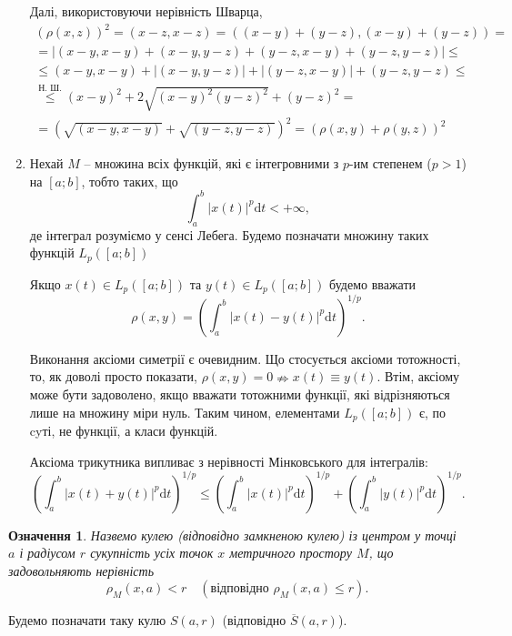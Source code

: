 \documentclass[14pt,twoside]{extreport}
\theoremstyle{mystyle}
\newtheorem{dfn}{Означення}
\numberwithin{equation}{chapter}
\begin{document}
\begin{enumerate}
 Далі, використовуючи нерівність Шварца,
 \begin{multline*}
   (\rho(x, z))^2 = (x - z , x - z) = ((x-y) + (y-z), (x-y) + (y-z)) =\\
   = |(x-y, x-y) + (x-y, y-z) + (y-z, x-y) +(y-z, y-z)| \leqslant\\
   \leqslant (x-y, x-y) + |(x-y, y-z)| + |(y-z, x-y)| +(y-z, y-z) \leqslant\\
   \mathop{\leqslant}\limits^{\textrm{Н. Ш.}} (x-y)^2 + 2\sqrt{(x-y)^2(y-z)^2} + (y-z)^2=\\
   = \left(\sqrt{(x-y, x-y)} + \sqrt{(y-z, y-z)}\right)^2 = (\rho(x,y) + \rho(y,z))^2
 \end{multline*}
 \item Нехай $M$ -- множина всіх функцій, які є інтегровними з $p$-им степенем ($p > 1$) на $[a; b]$, тобто таких, що
 \[
  \int_{a}^{b} |x(t)|^p \mathrm{d}t < +\infty,
 \]
 де інтеграл розуміємо у сенсі Лебега. Будемо позначати множину таких функцій $L_p([a; b])$

 Якщо $x(t) \in L_p([a; b])$ та $y(t) \in L_p([a; b])$ будемо вважати
 \begin{equation}
  \rho(x, y) = \left(\int_{a}^{b}|x(t) - y(t)|^p \mathrm{d}t\right)^{1/p}.
 \end{equation}

 Виконання аксіоми симетрії є очевидним. Що стосується аксіоми тотожності, то, як доволі просто показати, $\rho(x, y) = 0 \nRightarrow x(t) \equiv y(t)$. Втім, аксіому може бути задоволено, якщо вважати тотожними функції, які відрізняються лише на множину міри нуль. Таким чином, елементами $L_p([a; b])$ є, по cyті, не функції, а класи функцій.

 Аксіома трикутника випливає з нерівності Мінковського для інтегралів:
 \[
  \left(\int_{a}^{b} |x(t) + y(t)|^p \mathrm{d}t \right)^{1/p} \leqslant \left( \int_{a}^{b} |x(t)|^p \mathrm{d}t\right)^{1/p} + \left( \int_{a}^{b} |y(t)|^p \mathrm{d}t\right)^{1/p}.
 \]
\end{enumerate}

\begin{dfn} Назвемо кулею (відповідно замкненою кулею) із центром у точці $a$ і радіусом $r$ сукупність усіх точок $x$ метричного простору $M$, що задовольняють нерівність
\[
 \rho_M(x, a) < r \quad (\textrm{відповідно } \rho_M(x, a) \leqslant r).
\]
\end{dfn}

Будемо позначати таку кулю $S(a, r)$ (відповідно $\overline{S}(a, r)$).
\end{document}
